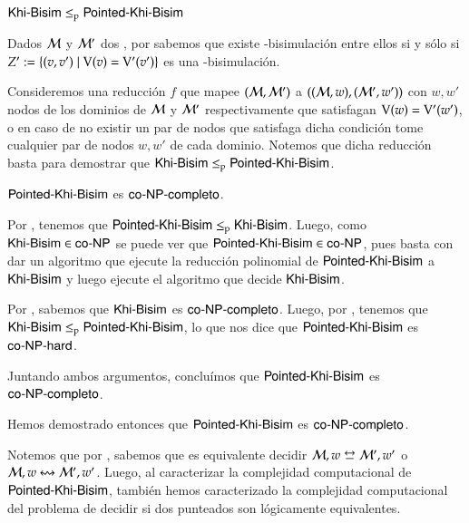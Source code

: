 \begin{lema}\label{lema:general-to-pointed}
    $\rm\textsf{Khi-Bisim} \leq_p \rm\textsf{Pointed-Khi-Bisim}$
\end{lema}

\begin{demostracion}
    Dados $\mathcal{M}$ y $\mathcal{M}'$ dos \ultss, por  sabemos que existe 
    \KHilogic-bisimulación entre ellos si y sólo si $Z' := \{(v,v') \mid \mathrm{V}(v) = \mathrm{V}'(v')\}$ es una \KHilogic-bisimulación.

    Consideremos una reducción $f$ que mapee $(\mathcal{M},\mathcal{M}')$ a $((\mathcal{M},w),(\mathcal{M}',w'))$ con $w,w'$ nodos de los dominios de $\mathcal{M}$ 
    y $\mathcal{M}'$ respectivamente que satisfagan $\mathrm{V}(w) = \mathrm{V}'(w')$, o en caso de no existir un par de nodos que satisfaga dicha condición tome cualquier 
    par de nodos $w,w'$ de cada dominio. Notemos que dicha reducción basta para demostrar que $\rm\textsf{Khi-Bisim} \leq_p \rm\textsf{Pointed-Khi-Bisim}$.
\end{demostracion}

\begin{teorema}
    $\rm\textsf{Pointed-Khi-Bisim}$ es $\rm\textsf{co-NP-completo}$.
\end{teorema}

\begin{demostracion}
    Por , tenemos que $\rm\textsf{Pointed-Khi-Bisim} \leq_p \rm\textsf{Khi-Bisim}$. Luego, como $\rm\textsf{Khi-Bisim} \in \rm\textsf{co-NP}$ se puede ver que 
    $\rm\textsf{Pointed-Khi-Bisim} \in \rm\textsf{co-NP}$, pues basta con dar un algoritmo que ejecute la reducción polinomial de $\rm\textsf{Pointed-Khi-Bisim}$ a $\rm\textsf{Khi-Bisim}$ y luego ejecute 
    el algoritmo que decide $\rm\textsf{Khi-Bisim}$.


    Por , sabemos que $\rm\textsf{Khi-Bisim}$ es $\rm\textsf{co-NP-completo}$. Luego, por , tenemos que 
    $\rm\textsf{Khi-Bisim} \leq_p \rm\textsf{Pointed-Khi-Bisim}$, lo que nos dice que $\rm\textsf{Pointed-Khi-Bisim}$ es $\rm\textsf{co-NP-hard}$.
    
    Juntando ambos argumentos, concluímos que $\rm\textsf{Pointed-Khi-Bisim}$ es $\rm\textsf{co-NP-completo}$.
\end{demostracion}


Hemos demostrado entonces que $\rm\textsf{Pointed-Khi-Bisim}$ es $\rm\textsf{co-NP-completo}$.

Notemos que por , sabemos que es equivalente decidir $\modults,w \bisim \modults',w'$ o 
$\mathcal{M},w \mathrel{\leftrightsquigarrow} \mathcal{M}',w'$. Luego, al caracterizar la complejidad computacional de $\rm\textsf{Pointed-Khi-Bisim}$, también hemos caracterizado 
la complejidad computacional del problema de decidir si dos \ultss punteados son lógicamente equivalentes.

